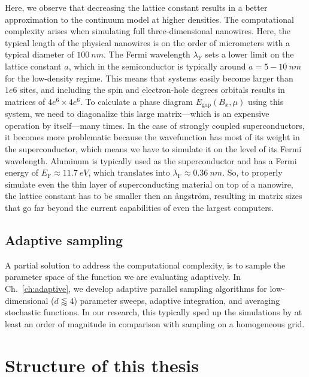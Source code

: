 Here, we observe that decreasing the lattice constant results in a better approximation to the continuum model at higher densities.
The computational complexity arises when simulating full three-dimensional nanowires.
Here, the typical length of the physical nanowires is on the order of micrometers with a typical diameter of $\SI{100}{nm}$.
The Fermi wavelength $\lambda_\textrm{F}$ sets a lower limit on the lattice constant $a$, which in the semiconductor is typically around $a=5-\SI{10}{nm}$ for the low-density regime.
This means that systems easily become larger than $1e6$ sites, and including the spin and electron-hole degrees orbitals results in matrices of $4e^6 \times 4e^6$.
To calculate a phase diagram $E_\textrm{gap}(B_x,\mu)$ using this system, we need to diagonalize this large matrix---which is an expensive operation by itself---many times.
In the case of strongly coupled superconductors, it becomes more problematic because the wavefunction has most of its weight in the superconductor, which means we have to simulate it on the level of its Fermi wavelength.
Aluminum is typically used as the superconductor and has a Fermi energy of $E_\textrm{F} \approx \SI{11.7}{eV}$, which translates into $\lambda_\textrm{F} \approx \SI{0.36}{nm}$.
So, to properly simulate even the thin layer of superconducting material on top of a nanowire, the lattice constant has to be smaller then an ångström, resulting in matrix sizes that go far beyond the current capabilities of even the largest computers.

\subsection{Adaptive sampling}
A partial solution to address the computational complexity, is to sample the parameter space of the function we are evaluating adaptively.
In Ch.~\ref{ch:adaptive}, we develop adaptive parallel sampling algorithms for low-dimensional ($d\lessapprox 4$) parameter sweeps, adaptive integration, and averaging stochastic functions.
In our research, this typically sped up the simulations by at least an order of magnitude in comparison with sampling on a homogeneous grid.




\section{Structure of this thesis}


